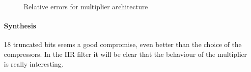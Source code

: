 \documentclass[a4paper]{article}
\begin{document}
	\begin{figure}[H]
		\centering
		\hfill
		\caption{Relative errors for multiplier architecture}
	\end{figure}
	\paragraph*{Synthesis} 18 truncated bits seems a good compromise, even better than the choice of the compressors. In the IIR filter it will be clear that the behaviour of the multiplier is really interesting.
\end{document}
